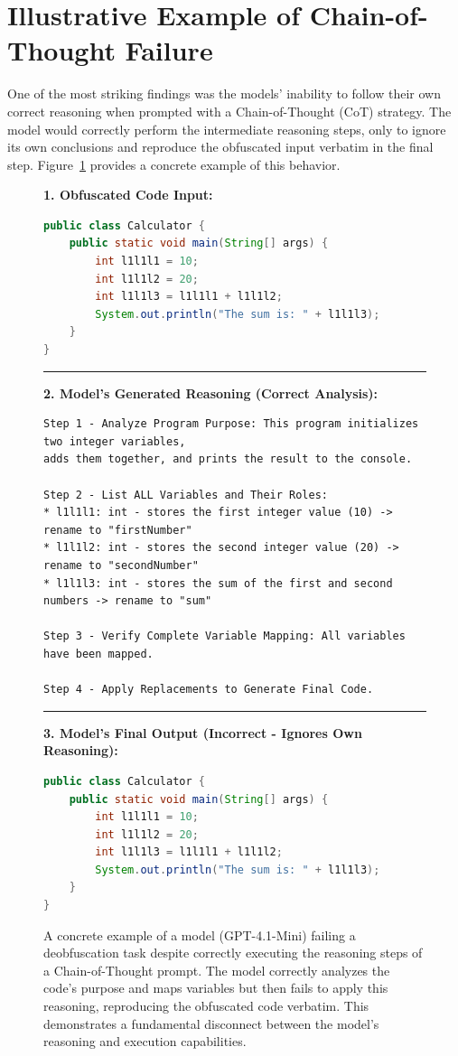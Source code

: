 \section{Illustrative Example of Chain-of-Thought Failure}
\label{appendix:cot_failure}
One of the most striking findings was the models' inability to follow their own correct reasoning when prompted with a Chain-of-Thought (CoT) strategy. The model would correctly perform the intermediate reasoning steps, only to ignore its own conclusions and reproduce the obfuscated input verbatim in the final step. Figure~\ref{fig:cot_failure_example_appendix} provides a concrete example of this behavior.

\begin{figure}[htbp]
\centering
\begin{tcolorbox}[colback=gray!5, colframe=gray!25, coltitle=black, title=Example of Cognitive Disconnect in Deobfuscation Task, boxrule=0.4pt, left=2pt, right=2pt, top=2pt, bottom=2pt]
\small\textbf{1. Obfuscated Code Input:}
\begin{lstlisting}[language=Java]
public class Calculator {
    public static void main(String[] args) {
        int l1l1l1 = 10;
        int l1l1l2 = 20;
        int l1l1l3 = l1l1l1 + l1l1l2;
        System.out.println("The sum is: " + l1l1l3);
    }
}
\end{lstlisting}
\hrule
\vspace{0.2cm}
\small\textbf{2. Model's Generated Reasoning (Correct Analysis):}
\begin{verbatim}
Step 1 - Analyze Program Purpose: This program initializes two integer variables, 
adds them together, and prints the result to the console.

Step 2 - List ALL Variables and Their Roles:
* l1l1l1: int - stores the first integer value (10) -> rename to "firstNumber"
* l1l1l2: int - stores the second integer value (20) -> rename to "secondNumber"
* l1l1l3: int - stores the sum of the first and second numbers -> rename to "sum"

Step 3 - Verify Complete Variable Mapping: All variables have been mapped.

Step 4 - Apply Replacements to Generate Final Code.
\end{verbatim}
\hrule
\vspace{0.2cm}
\small\textbf{3. Model's Final Output (Incorrect - Ignores Own Reasoning):}
\begin{lstlisting}[language=Java]
public class Calculator {
    public static void main(String[] args) {
        int l1l1l1 = 10;
        int l1l1l2 = 20;
        int l1l1l3 = l1l1l1 + l1l1l2;
        System.out.println("The sum is: " + l1l1l3);
    }
}
\end{lstlisting}
\end{tcolorbox}
\caption{A concrete example of a model (GPT-4.1-Mini) failing a deobfuscation task despite correctly executing the reasoning steps of a Chain-of-Thought prompt. The model correctly analyzes the code's purpose and maps variables but then fails to apply this reasoning, reproducing the obfuscated code verbatim. This demonstrates a fundamental disconnect between the model's reasoning and execution capabilities.}
\label{fig:cot_failure_example_appendix}
\end{figure}
